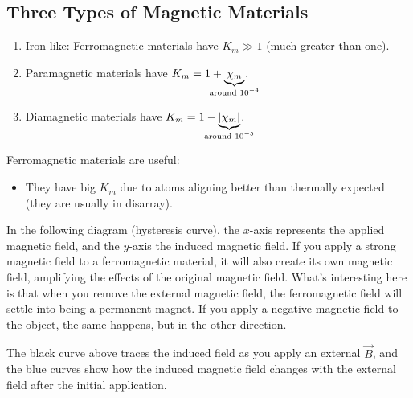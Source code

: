 \documentclass[class=article, crop=false]{standalone}
\begin{document}
  \subsection{Three Types of Magnetic Materials}
  \begin{enumerate}
    \item Iron-like: Ferromagnetic materials have $K_m \gg 1$ (much greater than one).
    \item Paramagnetic materials have $K_m = 1 + \underbrace{\chi_m}_{\mathclap{\text{around }10^{-4}}}$.
    \item Diamagnetic materials have $K_m = 1 - \underbrace{\abs{\chi_m}}_{\mathclap{\text{around }10^{-5}}}$.
  \end{enumerate}
  Ferromagnetic materials are useful:
  \begin{itemize}
    \item They have big $K_m$ due to atoms aligning better than thermally expected (they are usually in disarray).
  \end{itemize}
  In the following diagram (hysteresis curve), the $x$-axis represents the applied magnetic field, and the $y$-axis the induced magnetic field. If you apply a strong magnetic field to a ferromagnetic material, it will also create its own magnetic field, amplifying the effects of the original magnetic field. What's interesting here is that when you remove the external magnetic field, the ferromagnetic field will settle into being a permanent magnet. If you apply a negative magnetic field to the object, the same happens, but in the other direction.
  \begin{center}\end{center}
  The black curve above traces the induced field as you apply an external $\vec{B}$, and the blue curves show how the induced magnetic field changes with the external field after the initial application.
\end{document}
